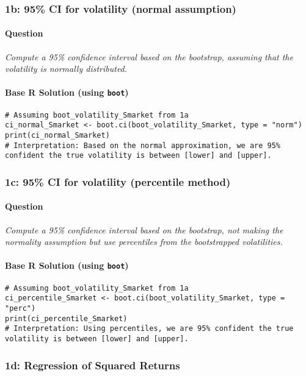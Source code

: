 \documentclass[12pt,a4paper]{article}
\newcommand{\Rpackage}[1]{\texttt{#1}} %
\begin{document}
    \subsubsection{1b: 95\% CI for volatility (normal assumption)}
        \paragraph{Question}
        \textit{Compute a 95\% confidence interval based on the bootstrap, assuming that the volatility is normally distributed.}
        \paragraph{Base R Solution (using \Rpackage{boot})}
\begin{lstlisting}[]
# Assuming boot_volatility_Smarket from 1a
ci_normal_Smarket <- boot.ci(boot_volatility_Smarket, type = "norm")
print(ci_normal_Smarket)
# Interpretation: Based on the normal approximation, we are 95% confident the true volatility is between [lower] and [upper].
\end{lstlisting}

    \subsubsection{1c: 95\% CI for volatility (percentile method)}
        \paragraph{Question}
        \textit{Compute a 95\% confidence interval based on the bootstrap, not making the normality assumption but use percentiles from the bootstrapped volatilities.}
        \paragraph{Base R Solution (using \Rpackage{boot})}
\begin{lstlisting}[]
# Assuming boot_volatility_Smarket from 1a
ci_percentile_Smarket <- boot.ci(boot_volatility_Smarket, type = "perc")
print(ci_percentile_Smarket)
# Interpretation: Using percentiles, we are 95% confident the true volatility is between [lower] and [upper].
\end{lstlisting}

    \subsubsection{1d: Regression of Squared Returns}
\end{document}
